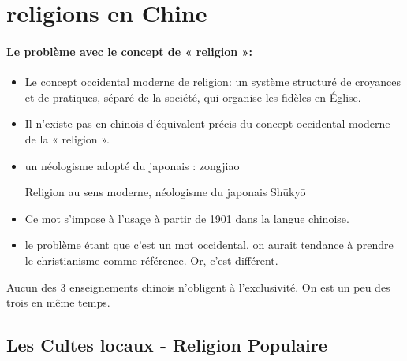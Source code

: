 \section{religions en Chine}
\paragraph{Le problème avec le concept de « religion »:}

\begin{itemize}
    \item  	Le concept occidental moderne de religion:
un système structuré de croyances et de pratiques, séparé de la société, qui organise les fidèles en Église.
    \item  Il n’existe pas en chinois d’équivalent précis du concept occidental moderne de la « religion ».
    \item  	un néologisme adopté du japonais : zongjiao  
    \begin{Def}[zongjiao - 宗教 ]
    Religion au sens moderne, néologisme du japonais  Shūkyō
\end{Def}
    \item  	Ce mot s’impose à l’usage à partir de 1901 dans la langue chinoise.
    \item le problème étant que c'est un mot occidental, on aurait tendance à prendre le christianisme comme référence. Or, c'est différent. 
    
\end{itemize}

\begin{Synthesis}
    Aucun des 3 enseignements chinois n'obligent à l'exclusivité. On est un peu des trois en même temps. 
\end{Synthesis}

 
\subsection{Les Cultes locaux - Religion Populaire}


